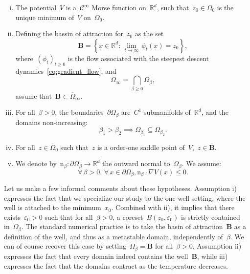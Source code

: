\documentclass[10pt]{article}
\newcommand{\R}{\mathbb{R}}
\newcommand{\1}{\mathbbm 1}
\begin{document}
    \begin{enumerate}[i)]
        \item{The potential~$V$ is a~$\mathcal C^\infty$ Morse function on~$\R^d$, such that~$z_0 \in \Omega_0$ is the unique minimum of~$V$ on~$\overline{\Omega}_0$.}
        \item{Defining the bassin of attraction for~$z_0$ as the set
        \begin{equation}
            \label{eq:basin}
            \mathbf{B} = \left\{ x \in \R^d:\,\underset{t\to\infty}{\lim}\,\phi_t(x) = z_0\right\},
        \end{equation}
        where~$(\phi_t)_{t\geq 0}$ is the flow associated with the steepest descent dynamics~\eqref{eq:gradient_flow},
        and 
       ~$$ \Omega_\infty = \bigcap_{\beta\geq 0}\Omega_\beta,$$
        assume that~$\mathbf{B} \subset \overline{\Omega}_\infty$.
        }
        \item{For all~$\beta>0$, the boundaries~$\partial \Omega_\beta$ are~$C^1$ submanifolds of~$\R^d$, and the domains non-increasing: \[\beta_1 > \beta_2 \implies \Omega_{\beta_1} \subseteq \Omega_{\beta_2}.\] }
        \item{For all~$z\in\overline{\Omega}_0$ such that~$z$ is a order-one saddle point of~$V$,~$z\in\overline{\mathbf{B}}$.}
        \item{We denote by~$\mathrm{n}_{\beta}: \partial \Omega_\beta \to \R^d$ the outward normal to~$\Omega_\beta$. We assume:
        \begin{equation}\forall\,\beta>0,\,\forall\,x \in \partial\Omega_\beta, \mathrm{n}_{\beta}\cdot \nabla V (x) \leq 0.\end{equation} }
    \end{enumerate}
    Let us make a few informal comments about these hypotheses. Assumption i) expresses the fact that we specialize our study to the one-well setting, where the well is attached to the minimum~$x_0$.
    Combined with ii), it implies that there exists~$\varepsilon_0>0$ such that for all~$\beta>0$, a coreset~$B(z_0,\varepsilon_0)$ is strictly contained in~$\Omega_\beta$. 
    The standard numerical practice is to take the basin of attraction~$\mathbf{B}$ as a definition of the well, and thus as a metastable domain, independently of~$\beta$. We can of course recover this case by setting~$\Omega_\beta = \mathbf B$ for all~$\beta>0$.
    Assumption ii) expresses the fact that every domain indeed contains the well~$\mathbf{B}$, while iii) expresses the fact that the domains contract as the temperature decreases.
\end{document}
